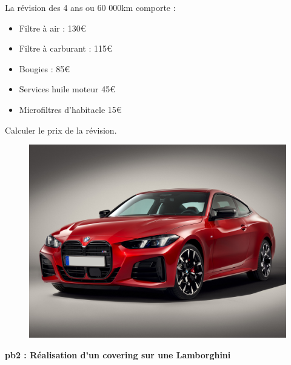 \begin{multicols}{2}

La révision des 4 ans ou 60 000km comporte : 

\begin{itemize}[label={$\bullet$}]
  \item Filtre à air : 130€
  \item Filtre à carburant : 115€
  \item Bougies : 85€ 
  \item Services huile moteur 45€
  \item Microfiltres d'habitacle 15€  
\end{itemize} 

Calculer le prix de la révision. \columnbreak

\begin{figure}[H]
  \centering
  \includegraphics[width=0.6\linewidth]{5x2-inegalite-triangulaire/bmw.jpg}
\end{figure}

\end{multicols}

\textbf{pb2 : Réalisation d'un covering sur une Lamborghini} \\

